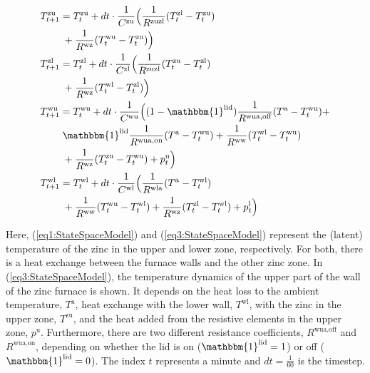 \documentclass[lettersize,journal]{IEEEtran}
\begin{document}
\begin{subequations}\label{eq:StateSpaceModel}
    \begin{align}
        T^{\text{zu}}_{t+1} & = T^{\text{zu}}_{t} + dt \cdot \frac{1}{C^{\text{zu}}}\Bigl( \frac{1}{R^{\text{zuzl}}} (T^{\text{zl}}_{t} - T^{\text{zu}}_{t}) \notag                                     \\ & \mspace{5mu} + \frac{1}{R^{\text{wz}}} (T^{\text{wu}}_{t} - T^{\text{zu}}_{t}) \Bigr) \label{eq1:StateSpaceModel} \\
        T^{\text{zl}}_{t+1} & = T^{\text{zl}}_{t} + dt \cdot \frac{1}{C^{\text{zl}}}\Bigl( \frac{1}{R^{\text{zuzl}}} (T^{\text{zu}}_{t} - T^{\text{zl}}_{t}) \notag                                     \\ & \mspace{5mu} + \frac{1}{R^{\text{wz}}} (T^{\text{wl}}_{t} - T^{\text{zl}}_{t}) \Bigr) \label{eq2:StateSpaceModel} \\
        T^{\text{wu}}_{t+1} & = T^{\text{wu}}_{t} + dt \cdot \frac{1}{C^{\text{wu}}}\Bigl( (1-\mathbbm{1}^{\text{lid}}) \frac{1}{R^{\text{wua},\text{off}}} (T^{\text{a}} - T^{\text{wu}}_{t}) \notag + \\ & \mspace{5mu} \mathbbm{1}^{\text{lid}} \frac{1}{R^{\text{wua},\text{on}}} (T^{\text{a}} - T^{\text{wu}}_{t}) + \frac{1}{R^{\text{ww}}} (T^{\text{wl}}_{t} - T^{\text{wu}}_{t}) \notag \\ & \mspace{5mu} + \frac{1}{R^{\text{wz}}} (T^{\text{zu}}_{t} - T^{\text{wu}}_{t}) + p^{\text{u}}_{t} \Bigr) \label{eq3:StateSpaceModel} \\
        T^{\text{wl}}_{t+1} & = T^{\text{wl}}_{t} + dt \cdot \frac{1}{C^{\text{wl}}}\Bigl( \frac{1}{R^{\text{wla}}} (T^{\text{a}} - T^{\text{wl}}_{t}) \notag                                           \\ & \mspace{5mu} + \frac{1}{R^{\text{ww}}} (T^{\text{wu}}_{t} - T^{\text{wl}}_{t}) + \frac{1}{R^{\text{wz}}} (T^{\text{zl}}_{t} - T^{\text{wl}}_{t}) + p^{\text{l}}_{t} \Bigr) \label{eq4:StateSpaceModel}
    \end{align}
\end{subequations}

Here, (\ref{eq1:StateSpaceModel}) and (\ref{eq3:StateSpaceModel}) represent the (latent) temperature of the zinc in the upper and lower zone, respectively. For both, there is a heat exchange between the furnace walls and the other zinc zone. In (\ref{eq3:StateSpaceModel}), the temperature dynamics of the upper part of the wall of the zinc furnace is shown. It depends on the heat loss to the ambient temperature, $T^{\text{a}}$, heat exchange with the lower wall, $T^{\text{wl}}$, with the zinc in the upper zone, $T^{\text{zu}}$, and the heat added from the resistive elements in the upper zone, $p^{\text{u}}$. Furthermore, there are two different resistance coefficients, $R^{\text{wua},\text{off}}$ and $R^{\text{wua},\text{on}}$, depending on whether the lid is on ($ \mathbbm{1}^{\text{lid}} = 1$) or off ($ \mathbbm{1}^{\text{lid}} = 0$). The index $t$ represents a minute and $dt = \frac{1}{60}$ is the timestep.
\end{document}
